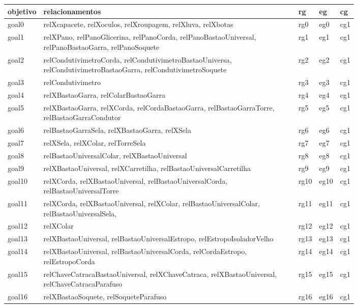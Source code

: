 \documentclass[12pt]{article}
\begin{document}
\begin{table}[H]
\centering
{}
\begin{tabular}{|l|p{0.8\linewidth}|l|l|l|}
\hline
\textbf{objetivo} & \textbf{relacionamentos} & \textbf{rg} & \textbf{eg} & \textbf{cg} \\ \hline
goal0 & relXcapacete, relXoculos, relXroupagem, relXluva, relXbotas & rg0 & eg0 & cg1 \\ \hline
goal1 & relXPano, relPanoGlicerina, relPanoCorda, relPanoBastaoUniversal, relPanoBastaoGarra, relPanoSoquete & rg1 & eg1 & cg1 \\ \hline
goal2 & relCondutivimetroCorda, relCondutivimetroBastaoUniversa, relCondutivimetroBastaoGarra, relCondutivimetroSoquete & rg2 & eg2 & cg1 \\ \hline
goal3 & relCondutivimetro & rg3 & eg3 & cg1 \\ \hline
goal4 & relXBastaoGarra, relColarBastaoGarra & rg4 & eg4 & cg1 \\ \hline
goal5 & relXBastaoGarra, relXCorda, relCordaBastaoGarra, relBastaoGarraTorre, relBastaoGarraCondutor & rg5 & eg5 & cg1 \\ \hline
goal6 & relBastaoGarraSela, relXBastaoGarra, relXSela & rg6 & eg6 & cg1 \\ \hline
goal7 & relXSela, relXColar, relTorreSela & rg7 & eg7 & cg1 \\ \hline
goal8 & relBastaoUniversalColar, relXBastaoUniversal & rg8 & eg8 & cg1 \\ \hline
goal9 & relXBastaoUniversal, relXCarretilha, relBastaoUniversalCarretilha & rg9 & eg9 & cg1 \\ \hline
goal10 & relXCorda, relXBastaoUniversal, relBastaoUniversalCorda, relBastaoUniversalTorre & rg10 & eg10 & cg1 \\ \hline
goal11 & relXCorda, relXBastaoUniversal, relXColar, relBastaoUniversalColar, relBastaoUniversalSela, & rg11 & eg11 & cg1 \\ \hline
goal12 & relXColar & rg12 & eg12 & cg1 \\ \hline
goal13 & relXBastaoUniversal, relBastaoUniversalEstropo, relEstropoIsoladorVelho & rg13 & eg13 & cg1 \\ \hline
goal14 & relXBastaoUniversal, relBastaoUniversalCorda, relCordaEstropo, relEstropoCorda & rg14 & eg14 & cg1 \\ \hline
goal15 & relChaveCatracaBastaoUniversal, relXChaveCatraca, relXBastaoUniversal, relChaveCatracaParafuso & rg15 & eg15 & cg1 \\ \hline
goal16 & relXBastaoSoquete, relSoqueteParafuso & rg16 & eg16 & cg1 \\ \hline

\end{tabular}
\end{table}
\end{document}
